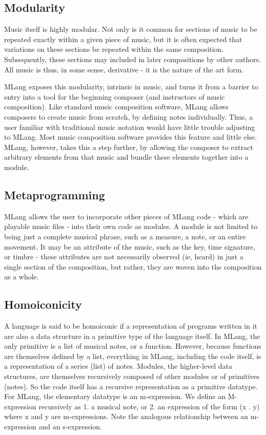 \documentclass[letterpaper,11pt]{article}
\begin{document}
\subsection{Modularity}
Music itself is highly modular. Not only is it common for sections of music to be repeated exactly within a given piece of music, but it is often expected that variations on these sections be repeated within the same composition. Subsequently, these sections may included in later compositions by other authors. All music is thus, in some sense, derivative - it is the nature of the art form.  

MLang exposes this modularity, intrinsic in music, and turns it from a barrier to entry into a tool for the beginning composer (and instructors of music composition). Like standard music composition software, MLang allows composers to create music from scratch, by defining notes individually.  Thus, a user familiar with traditional music notation would have little trouble adjusting to MLang. Most music composition software provides this feature and little else. MLang, however, takes this a step further, by allowing the composer to extract arbitrary elements from that music and bundle these elements together into a module.

\subsection{Metaprogramming}
MLang allows the user to incorporate other pieces of MLang code - which are playable music files - into their own code as modules. A module is not limited to being just a complete musical phrase, such as a measure, a note, or an entire movement. It may be an attribute of the music, such as the key, time signature, or timbre - these attributes are not necessarily observed (ie, heard) in just a single section of the composition, but rather, they are woven into the composition as a whole. 


\subsection{Homoiconicity}
A language is said to be homoiconic if a representation of programs written in it are also a data structure in a primitive type of the language itself. In MLang, the only primitive is a list of musical notes, or a function. However, because functions are themselves defined by a list, everything in MLang, including the code itself, is a representation of a series (list) of notes. Modules, the higher-level data structures, are themselves recursively composed of other modules or of primitives (notes). So the code itself has a recursive representation as a primitive datatype. For MLang, the elementary datatype is an m-expression. We define an M-expression recursively as 
1. a musical note, or
2. an expression of the form (x . y) where x and y are m-expressions.
Note the analogous relationship between an m-expression and an s-expression.
\end{document}

